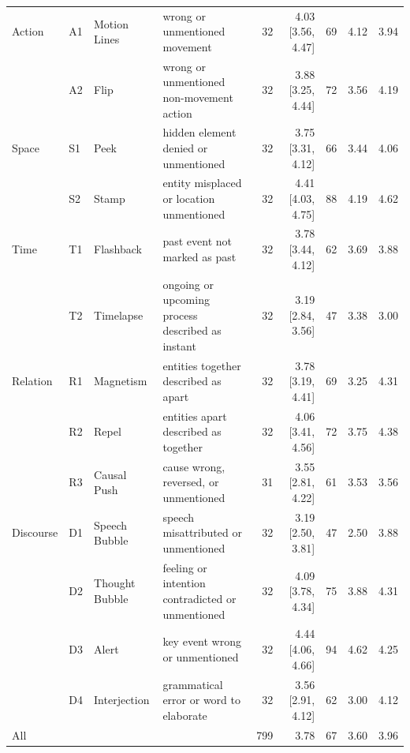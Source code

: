 \begin{table}[t]
\begin{tabular}{llllrrrrr}
Action & A1 & Motion Lines & wrong or unmentioned movement & 32 & 4.03 [3.56, 4.47] & 69 & 4.12 & 3.94 \\
 & A2 & Flip & wrong or unmentioned non-movement action & 32 & 3.88 [3.25, 4.44] & 72 & 3.56 & 4.19 \\
\addlinespace[2pt]
Space & S1 & Peek & hidden element denied or unmentioned & 32 & 3.75 [3.31, 4.12] & 66 & 3.44 & 4.06 \\
 & S2 & Stamp & entity misplaced or location unmentioned & 32 & 4.41 [4.03, 4.75] & 88 & 4.19 & 4.62 \\
\addlinespace[2pt]
Time & T1 & Flashback & past event not marked as past & 32 & 3.78 [3.44, 4.12] & 62 & 3.69 & 3.88 \\
 & T2 & Timelapse & ongoing or upcoming process described as instant & 32 & 3.19 [2.84, 3.56] & 47 & 3.38 & 3.00 \\
\addlinespace[2pt]
Relation & R1 & Magnetism & entities together described as apart & 32 & 3.78 [3.19, 4.41] & 69 & 3.25 & 4.31 \\
 & R2 & Repel & entities apart described as together & 32 & 4.06 [3.41, 4.56] & 72 & 3.75 & 4.38 \\
 & R3 & Causal Push & cause wrong, reversed, or unmentioned & 31 & 3.55 [2.81, 4.22] & 61 & 3.53 & 3.56 \\
\addlinespace[2pt]
Discourse & D1 & Speech Bubble & speech misattributed or unmentioned & 32 & 3.19 [2.50, 3.81] & 47 & 2.50 & 3.88 \\
 & D2 & Thought Bubble & feeling or intention contradicted or unmentioned & 32 & 4.09 [3.78, 4.34] & 75 & 3.88 & 4.31 \\
 & D3 & Alert & key event wrong or unmentioned & 32 & 4.44 [4.06, 4.66] & 94 & 4.62 & 4.25 \\
 & D4 & Interjection & grammatical error or word to elaborate & 32 & 3.56 [2.91, 4.12] & 62 & 3.00 & 4.12 \\
\midrule
All & & & & 799 & 3.78 & 67 & 3.60 & 3.96 \\
\bottomrule
\end{tabular}
\end{table}